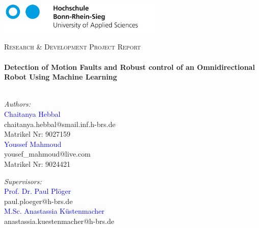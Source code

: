 \documentclass[11pt, oneside, table, xcdraw]{Thesis} %
\begin{document}
\begin{titlepage}
\begin{center}

\includegraphics[width=0.59\textwidth]{./logos/hbrs-logo.jpg}

\textsc{\Large Research \& Development Project Report}\\[0.5cm] %

\HRule \\[0.4cm] %
{\huge \bfseries Detection of Motion Faults and Robust control of an
Omnidirectional Robot Using Machine Learning}\\[0.4cm] %
\HRule \\[1.5cm] %
 
\vspace{-5mm}
\begin{minipage}{0.4\textwidth}
\begin{flushleft} \large
\vspace{-5mm}
\emph{Authors:}\\
\textcolor{blue}{Chaitanya Hebbal} \\chaitanya.hebbal@smail.inf.h-brs.de \\Matrikel Nr: 9027159 \\\textcolor{blue} {Youssef Mahmoud} %
\\yousef\_mahmoud@live.com
\\Matrikel Nr: 9024421
\end{flushleft}
\end{minipage}
\hspace{12mm}
\begin{minipage}{0.4\textwidth}
\begin{flushright} \large
\emph{Supervisors:} \\
\textcolor{blue}{Prof. Dr. Paul Plöger} \\paul.ploeger@h-brs.de \\\textcolor{blue}{M.Sc. Anastassia K\"ustenmacher} \\anastassia.kuestenmacher@h-brs.de %
\end{flushright}
\end{minipage}\\[3cm]
 

\end{center}
\end{titlepage}
\end{document}
